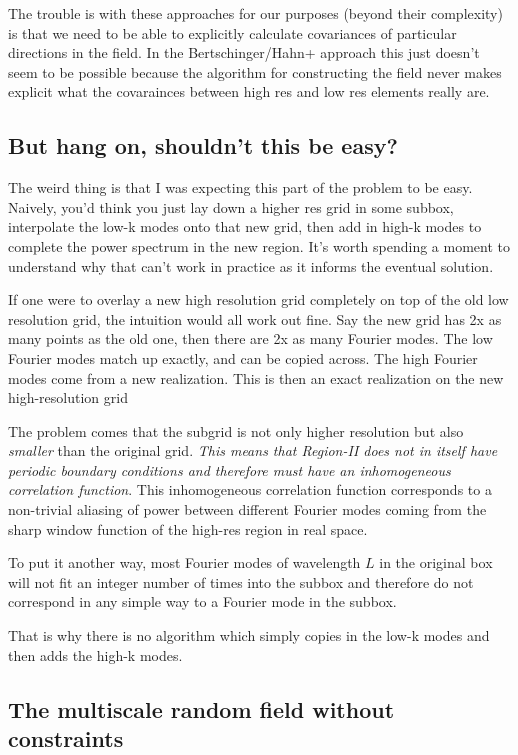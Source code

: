 \documentclass[11pt,a4paper,preprint]{aastex}
\begin{document}
The trouble is with these approaches for our purposes (beyond their
complexity) is that we need to be able to explicitly calculate
covariances of particular directions in the field. In the
Bertschinger/Hahn+ approach this just doesn't seem to be possible
because the algorithm for constructing the field never makes explicit
what the covarainces between high res and low res elements really
are.

\subsection{But hang on, shouldn't this be easy?}

The weird thing is that I was expecting this part of the problem to be
easy. Naively, you'd think you just lay down a higher res grid in some
subbox, interpolate the low-k modes onto that new grid, then add in
high-k modes to complete the power spectrum in the new region. It's
worth spending a moment to understand why that can't work in practice
as it informs the eventual solution.

If one were to overlay a new high resolution grid completely on top of
the old low resolution grid, the intuition would all work out
fine. Say the new grid has 2x as many points as the old one, then
there are 2x as many Fourier modes. The low Fourier modes match up
exactly, and can be copied across. The high Fourier modes come from a
new realization.  This is then an exact realization on the new
high-resolution grid

The problem comes that the subgrid is not only higher resolution but
also {\it smaller} than the original grid. {\it This means that
  Region-II does not in itself have periodic boundary conditions and
  therefore must have an inhomogeneous correlation function}. This
inhomogeneous correlation function corresponds to a non-trivial
aliasing of power between different Fourier modes coming from the
sharp window function of the high-res region in real space.

To put it another way, most Fourier modes of wavelength $L$ in the
original box will not fit an integer number of times into the subbox
and therefore do not correspond in any simple way to a Fourier mode in the
subbox.

That is why there is no algorithm which simply copies in the low-k
modes and then adds the high-k modes.

\subsection{The multiscale random field without constraints}
\end{document}
